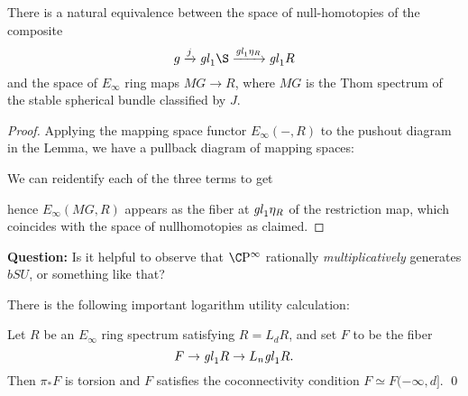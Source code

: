 \begin{corollary}
There is a natural equivalence between the space of null-homotopies of the composite \[g \xrightarrow j \gl_1 \S \xrightarrow{\gl_1 \eta_R} \gl_1 R\] and the space of $E_\infty$ ring maps $MG \to R$, where $MG$ is the Thom spectrum of the stable spherical bundle classified by $J$.
\end{corollary}
\begin{proof}
Applying the mapping space functor $E_\infty(-, R)$ to the pushout diagram in the Lemma, we have a pullback diagram of mapping spaces:
\begin{center}
\end{center}
We can reidentify each of the three terms to get
\begin{center}
\end{center}
hence $E_\infty(MG, R)$ appears as the fiber at $\mathit{gl}_1 \eta_R$ of the restriction map, which coincides with the space of nullhomotopies as claimed.
\end{proof}






\textbf{Question:}  Is it helpful to observe that $\CP^\infty$ rationally \emph{multiplicatively} generates $bSU$, or something like that?





There is the following important logarithm utility calculation:

\begin{theorem}
Let $R$ be an $E_\infty$ ring spectrum satisfying $R = L_d R$, and set $F$ to be the fiber \[F \to \mathit{gl}_1 R \to L_n \mathit{gl}_1 R.\]  Then $\pi_* F$ is torsion and $F$ satisfies the coconnectivity condition $F \simeq F(-\infty, d]$. \qed
\end{theorem}


